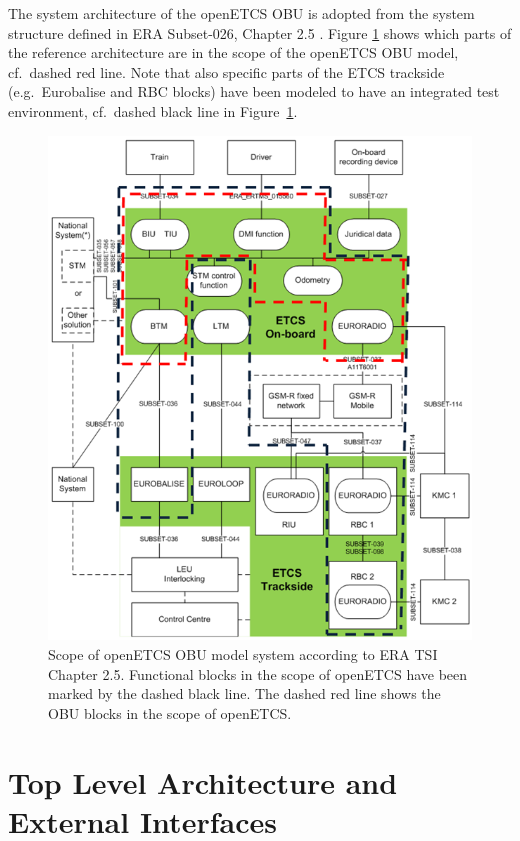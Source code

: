 
The system architecture of the openETCS OBU is adopted from the system structure defined in ERA Subset-026, Chapter 2.5 \cite{subset-026}. Figure \ref{f:architecture_srs} shows which parts of the reference architecture are in the scope of the openETCS OBU model, cf.~dashed red line. Note that also specific parts of the ETCS trackside (e.g.~Eurobalise and RBC blocks) have been modeled to have an integrated test environment, cf.~dashed black line in Figure~\ref{f:architecture_srs}.

\begin{figure}[H]
\centering
\includegraphics[width=.8\textwidth]{images/ArchitectureSRS}
\caption[Scope of openETCS OBU model system according to ERA TSI Chapter 2.5.]{Scope of openETCS OBU model system according to ERA TSI Chapter 2.5. Functional blocks in the scope of openETCS have been marked by the dashed black line. The dashed red line shows the OBU blocks in the scope of openETCS.}
\label{f:architecture_srs}
\end{figure}


\section{Top Level Architecture and External Interfaces}

